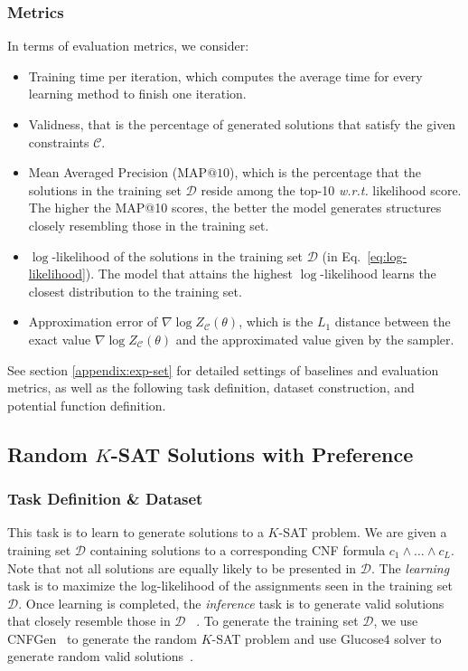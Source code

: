 \subsubsection*{Metrics} In terms of evaluation metrics, we consider:
\begin{itemize}
    \item Training time per iteration, which computes the average time for every learning
          method to finish one iteration.
    \item Validness, that is the percentage of generated solutions that satisfy the given
          constraints $\mathcal{C}$.
    \item  Mean Averaged Precision (MAP$@10$), which is the percentage that the solutions
          in the training set $\mathcal{D}$ reside among the top-10 \textit{w.r.t.}
          likelihood score. The higher the MAP@10 scores, the better the model generates
          structures closely resembling those in the training set.
    \item $\log$-likelihood of the solutions in the training set $\mathcal{D}$ (in Eq.~\ref{eq:log-likelihood}). The model that attains the highest $\log$-likelihood learns the closest distribution to the training set.
    \item Approximation error of $\nabla \log Z_{\mathcal{C}}(\theta)$, which is the
          $L_1$ distance between the exact value $ \nabla \log Z_{\mathcal{C}}(\theta)$
          and the approximated value given by the sampler.
\end{itemize}
See section \ref{appendix:exp-set} for detailed settings of baselines and evaluation metrics, as well as the following task definition, dataset construction, and potential function definition.

\subsection{Random $K$-SAT Solutions with Preference}
\subsubsection*{Task Definition \& Dataset}  This task is to learn to generate solutions to a $K$-SAT problem.
%
We are given a training set $\mathcal{D}$ containing solutions to a
corresponding CNF formula $c_1\wedge\ldots\wedge c_L$.
%
Note that not all solutions are equally likely to be presented in
$\mathcal{D}$.
%
The \textit{learning} task is to maximize the log-likelihood of the assignments
seen in the training set $\mathcal{D}$. Once learning is completed, the
\textit{inference} task is to generate valid solutions that closely resemble
those in $\mathcal{D}$ ~\citep{DBLP:conf/aiia/DodaroP19}.
%
To generate the training set $\mathcal{D}$, we use
CNFGen~\citep{DBLP:conf/sat/LauriaENV17} to generate the random $K$-SAT problem
and use Glucose4 solver to generate random valid
solutions~\citep{DBLP:conf/sat/IgnatievMM18}.

